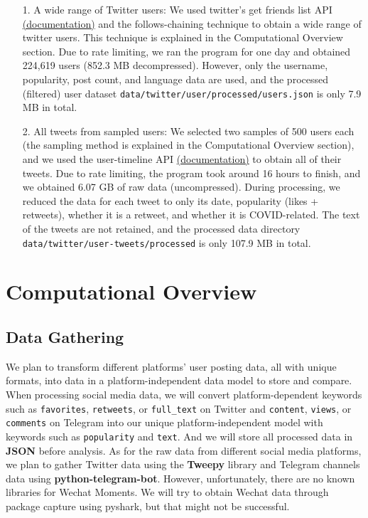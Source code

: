 \documentclass{article}
\newcommand{\C}{\texttt}
\begin{document}
    \begin{itemize}
        \item[1.] A wide range of Twitter users: We used twitter's get friends list API \href{https://developer.twitter.com/en/docs/twitter-api/v1/accounts-and-users/follow-search-get-users/api-reference/get-friends-list}{(documentation)} and the follows-chaining technique to obtain a wide range of twitter users. This technique is explained in the Computational Overview section. Due to rate limiting, we ran the program for one day and obtained 224,619 users (852.3 MB decompressed). However, only the username, popularity, post count, and language data are used, and the processed (filtered) user dataset \C{data/twitter/user/processed/users.json} is only 7.9 MB in total.
         
        \item[2.] All tweets from sampled users: We selected two samples of 500 users each (the sampling method is explained in the Computational Overview section), and we used the user-timeline API \href{https://developer.twitter.com/en/docs/twitter-api/v1/tweets/timelines/api-reference/get-statuses-user_timeline}{(documentation)} to obtain all of their tweets. Due to rate limiting, the program took around 16 hours to finish, and we obtained 6.07 GB of raw data (uncompressed). During processing, we reduced the data for each tweet to only its date, popularity (likes + retweets), whether it is a retweet, and whether it is COVID-related. The text of the tweets are not retained, and the processed data directory \C{data/twitter/user-tweets/processed} is only 107.9 MB in total.
    \end{itemize}
 
    \section{Computational Overview}

    \subsection*{Data Gathering}
    \indent

    We plan to transform different platforms’ user posting data, all with unique formats, into data in a platform-independent data model to store and compare. When processing social media data, we will convert platform-dependent keywords such as \texttt{favorites}, \texttt{retweets}, or \texttt{full\_text} on Twitter and \texttt{content}, \texttt{views}, or \texttt{comments} on Telegram into our unique platform-independent model with keywords such as \texttt{popularity} and \texttt{text}. And we will store all processed data in \textbf{JSON} before analysis. As for the raw data from different social media platforms, we plan to gather Twitter data using the \textbf{Tweepy} library and Telegram channels data using \textbf{python-telegram-bot}. However, unfortunately, there are no known libraries for Wechat Moments. We will try to obtain Wechat data through package capture using pyshark, but that might not be successful.
\end{document}
